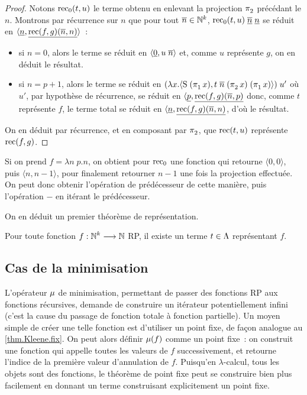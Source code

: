 \begin{proof}
  Notons $\operatorname{rec}_0(t,u)$ le terme obtenu en enlevant la projection $\mathop{\pi_{2}^{}}$
  précédant le $n$. Montrons par récurrence sur $n$ que pour tout
  $\overline{n} \in \mathbb N^k$, $\operatorname{rec}_0(t,u)\;\underline{\overline{n}}\;\underline{n}$ se
  réduit en $\langle \underline{n},\underline{\operatorname{rec}(f,g)(\overline{n},n)}\rangle$~:
  \begin{itemize}
  \item si $n = 0$, alors le terme se réduit en
    $\langle \underline{0},u\;\overline{n}\rangle$ et, comme $u$ représente
    $g$, on en déduit le résultat.
  \item si $n = p + 1$, alors le terme se réduit en
    $(\lambda x.\langle \operatorname{S}\;(\mathop{\pi_{1}^{}}x), t \;\overline{n}\;(\mathop{\pi_{2}^{}}x)\;
    (\mathop{\pi_{1}^{}}x)\rangle)\;u'$
    où $u'$, par hypothèse de récurrence, se réduit en
    $\langle \underline{p}, \underline{\operatorname{rec}(f,g)(\overline{n}, p)}$ donc,
    comme $t$ représente $f$, le terme total se réduit en
    $\langle \underline{n},\underline{\operatorname{rec}(f,g)(\overline{n},n)}$, d'où le résultat.
  \end{itemize}
  On en déduit par récurrence, et en composant par $\mathop{\pi_{2}^{}}$, que
  $\operatorname{rec}(t,u)$ représente $\operatorname{rec}(f,g)$.
\end{proof}

\begin{remark}
  Si on prend $f = \lambda n\;p.n$, on obtient pour $\operatorname{rec}_0$ une fonction qui
  retourne $\langle 0,0\rangle$, puis $\langle n,n-1\rangle$, pour finalement
  retourner $n-1$ une fois la projection effectuée. On peut donc obtenir
  l'opération de prédécesseur de cette manière, puis l'opération $-$ en
  itérant le prédécesseur.
\end{remark}

On en déduit un premier théorème de représentation.

\begin{theorem}
  Pour toute fonction $f : \displaystyle \mathbb N^k \longrightarrow \mathbb N$ RP, il existe un terme
  $t \in \Lambda$ représentant $f$.
\end{theorem}

\subsection{Cas de la minimisation}

L'opérateur $\mathbin{\mu}$ de minimisation, permettant de passer des fonctions RP aux
fonctions récursives, demande de construire un itérateur potentiellement
infini (c'est la cause du passage de fonction totale à fonction partielle).
Un moyen simple de créer une telle fonction est d'utiliser un point fixe, de
façon analogue au \cref{thm.Kleene.fix}. On peut alors définir $\mathbin{\mu}(f)$
comme un point fixe~: on construit une fonction qui appelle toutes les
valeurs de $f$ successivement, et retourne l'indice de la première valeur
d'annulation de $f$. Puisqu'en $\lambda$-calcul, tous les objets sont des
fonctions, le théorème de point fixe peut se construire bien plus facilement
en donnant un terme construisant explicitement un point fixe.

